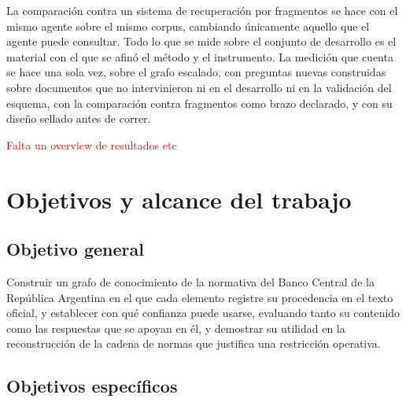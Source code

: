 \documentclass[12pt,a4paper]{report}
\begin{document}
La comparación contra un sistema de recuperación por fragmentos se hace con el mismo agente sobre el mismo corpus, cambiando únicamente aquello que el agente puede consultar. Todo lo que se mide sobre el conjunto de desarrollo es el material con el que se afinó el método y el instrumento. La medición que cuenta se hace una sola vez, sobre el grafo escalado, con preguntas nuevas construidas sobre documentos que no intervinieron ni en el desarrollo ni en la validación del esquema, con la comparación contra fragmentos como brazo declarado, y con su diseño sellado antes de correr.

\textcolor{red}{Falta un overview de resultados etc}

\section{Objetivos y alcance del trabajo}

\subsection{Objetivo general}

Construir un grafo de conocimiento de la normativa del Banco Central de la República Argentina en el que cada elemento registre su procedencia en el texto oficial, y establecer con qué confianza puede usarse, evaluando tanto su contenido como las respuestas que se apoyan en él, y demostrar su utilidad en la reconstrucción de la cadena de normas que justifica una restricción operativa.

\subsection{Objetivos específicos}
\end{document}
